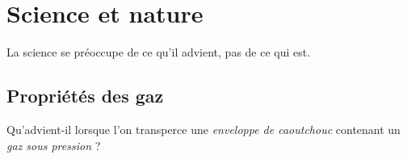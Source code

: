 

\section{Science et nature}

La science se préoccupe de ce qu'il advient, pas de ce qui est.

 \subsection{Propriétés des gaz}

Qu'advient-il lorsque l'on transperce une {\it enveloppe de caoutchouc} contenant un {\it gaz sous pression} ?








